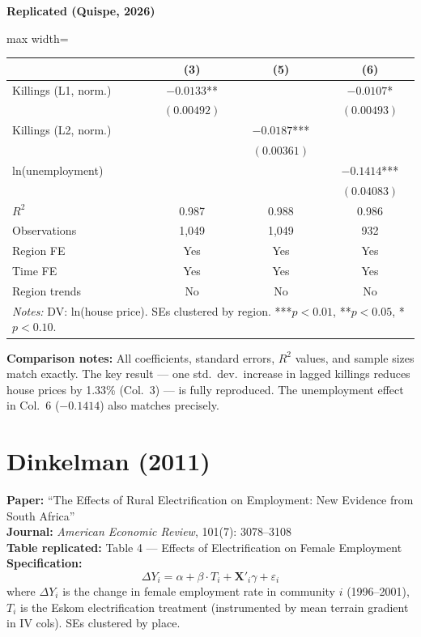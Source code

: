 \documentclass[11pt,a4paper]{article}
\begin{document}
\begin{minipage}[t]{0.48\textwidth}
\centering
\textbf{\large Replicated (Quispe, 2026)}
\vspace{0.3cm}

\begin{adjustbox}{max width=\textwidth}
\begin{tabular}{lccc}
\toprule
 & (3) & (5) & (6) \\
\midrule
Killings (L1, norm.) & $-0.0133$** & & $-0.0107$* \\
 & $(0.00492)$ & & $(0.00493)$ \\[0.3em]
Killings (L2, norm.) & & $-0.0187$*** & \\
 & & $(0.00361)$ & \\[0.3em]
ln(unemployment) & & & $-0.1414$*** \\
 & & & $(0.04083)$ \\[0.3em]
\midrule
$R^2$ & 0.987 & 0.988 & 0.986 \\
Observations & 1,049 & 1,049 & 932 \\
Region FE & Yes & Yes & Yes \\
Time FE & Yes & Yes & Yes \\
Region trends & No & No & No \\
\bottomrule
\multicolumn{4}{p{0.95\textwidth}}{\footnotesize\textit{Notes:} DV: ln(house price). SEs clustered by region. ***$p<0.01$, **$p<0.05$, *$p<0.10$.}
\end{tabular}
\end{adjustbox}
\end{minipage}

\vspace{1cm}
\textbf{Comparison notes:} All coefficients, standard errors, $R^2$ values, and sample sizes match exactly. The key result --- one std.\ dev.\ increase in lagged killings reduces house prices by 1.33\% (Col.\ 3) --- is fully reproduced. The unemployment effect in Col.\ 6 ($-0.1414$) also matches precisely.

\newpage

\section{Dinkelman (2011)}

\textbf{Paper:} ``The Effects of Rural Electrification on Employment: New Evidence from South Africa''\\
\textbf{Journal:} \textit{American Economic Review}, 101(7): 3078--3108\\
\textbf{Table replicated:} Table 4 --- Effects of Electrification on Female Employment\\
\textbf{Specification:}
\[
\Delta Y_i = \alpha + \beta \cdot T_i + \mathbf{X}'_i \gamma + \varepsilon_i
\]
where $\Delta Y_i$ is the change in female employment rate in community $i$ (1996--2001), $T_i$ is the Eskom electrification treatment (instrumented by mean terrain gradient in IV cols). SEs clustered by place.
\end{document}
